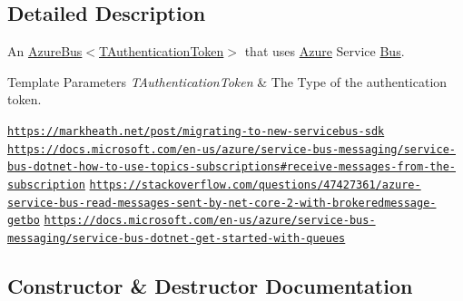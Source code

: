 \subsection{Detailed Description}
An \hyperlink{classCqrs_1_1Azure_1_1ServiceBus_1_1AzureBus_a1046ff74282fd178f43e28420433d2a9_a1046ff74282fd178f43e28420433d2a9}{Azure\+Bus$<$\+T\+Authentication\+Token$>$} that uses \hyperlink{namespaceCqrs_1_1Azure}{Azure} Service \hyperlink{namespaceCqrs_1_1Bus}{Bus}. 


\begin{DoxyTemplParams}{Template Parameters}
{\em T\+Authentication\+Token} & The Type of the authentication token.\\
\hline
\end{DoxyTemplParams}


\href{https://markheath.net/post/migrating-to-new-servicebus-sdk}{\tt https\+://markheath.\+net/post/migrating-\/to-\/new-\/servicebus-\/sdk} \href{https://docs.microsoft.com/en-us/azure/service-bus-messaging/service-bus-dotnet-how-to-use-topics-subscriptions#receive-messages-from-the-subscription}{\tt https\+://docs.\+microsoft.\+com/en-\/us/azure/service-\/bus-\/messaging/service-\/bus-\/dotnet-\/how-\/to-\/use-\/topics-\/subscriptions\#receive-\/messages-\/from-\/the-\/subscription} \href{https://stackoverflow.com/questions/47427361/azure-service-bus-read-messages-sent-by-net-core-2-with-brokeredmessage-getbo}{\tt https\+://stackoverflow.\+com/questions/47427361/azure-\/service-\/bus-\/read-\/messages-\/sent-\/by-\/net-\/core-\/2-\/with-\/brokeredmessage-\/getbo} \href{https://docs.microsoft.com/en-us/azure/service-bus-messaging/service-bus-dotnet-get-started-with-queues}{\tt https\+://docs.\+microsoft.\+com/en-\/us/azure/service-\/bus-\/messaging/service-\/bus-\/dotnet-\/get-\/started-\/with-\/queues} 

\subsection{Constructor \& Destructor Documentation}
\mbox{\label{classCqrs_1_1Azure_1_1ServiceBus_1_1AzureServiceBus_a09e34bafdb96fb8136efa428df9f80b2_a09e34bafdb96fb8136efa428df9f80b2}} 

